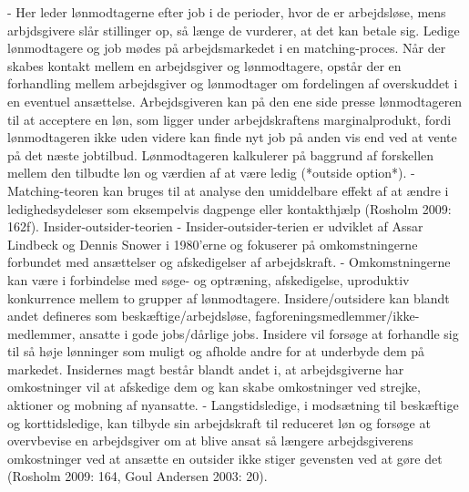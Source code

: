 - Her leder lønmodtagerne efter job i de perioder, hvor de er arbejdsløse, mens arbjdsgivere slår stillinger op, så længe de vurderer, at det kan betale sig. Ledige lønmodtagere og job mødes på arbejdsmarkedet i en matching-proces. Når der skabes kontakt mellem en arbejdsgiver og lønmodtagere, opstår der en forhandling mellem arbejdsgiver og lønmodtager om fordelingen af overskuddet i en eventuel ansættelse. Arbejdsgiveren kan på den ene side presse lønmodtageren til at acceptere en løn, som ligger under arbejdskraftens marginalprodukt, fordi lønmodtageren ikke uden videre kan finde nyt job på anden vis end ved at vente på det næste jobtilbud. Lønmodtageren kalkulerer på baggrund af forskellen mellem den tilbudte løn og værdien af at være ledig (*outside option*).
- Matching-teoren kan bruges til at analyse den umiddelbare effekt af at ændre i ledighedsydeleser som eksempelvis dagpenge eller kontakthjælp (Rosholm 2009: 162f).
Insider-outsider-teorien
- Insider-outsider-terien er udviklet af Assar Lindbeck og Dennis Snower i 1980'erne og fokuserer på omkomstningerne forbundet med ansættelser og afskedigelser af arbejdskraft.
- Omkomstningerne kan være i forbindelse med søge- og optræning, afskedigelse, uproduktiv konkurrence mellem to grupper af lønmodtagere. Insidere/outsidere kan blandt andet defineres som beskæftige/arbejdsløse, fagforeningsmedlemmer/ikke-medlemmer, ansatte i gode jobs/dårlige jobs. Insidere vil forsøge at forhandle sig til så høje lønninger som muligt og afholde andre for at underbyde dem på markedet. Insidernes magt består blandt andet i, at arbejdsgiverne har omkostninger vil at afskedige dem og kan skabe omkostninger ved strejke, aktioner og mobning af nyansatte.
- Langstidsledige, i modsætning til beskæftige og korttidsledige, kan tilbyde sin arbejdskraft til reduceret løn og forsøge at overvbevise en arbejdsgiver om at blive ansat så længere arbejdsgiverens omkostninger ved at ansætte en outsider ikke stiger gevensten ved at gøre det (Rosholm 2009: 164, Goul Andersen 2003: 20).

